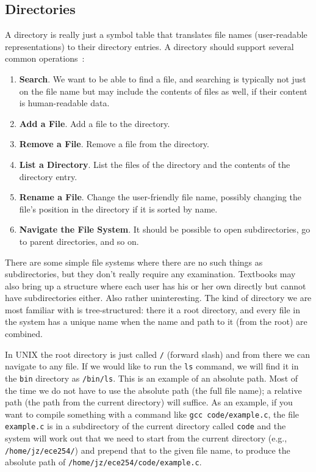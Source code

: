 \subsection*{Directories}

A directory is really just a symbol table that translates file names (user-readable representations) to their directory entries. A directory should support several common operations~\cite{osc}:

\begin{enumerate}
	\item \textbf{Search}. We want to be able to find a file, and searching is typically not just on the file name but may include the contents of files as well, if their content is human-readable data.
	\item \textbf{Add a File}. Add a file to the directory.
	\item \textbf{Remove a File}. Remove a file from the directory.
	\item \textbf{List a Directory}. List the files of the directory and the contents of the directory entry.
	\item \textbf{Rename a File}. Change the user-friendly file name, possibly changing the file's position in the directory if it is sorted by name.
	\item \textbf{Navigate the File System}. It should be possible to open subdirectories, go to parent directories, and so on.
\end{enumerate}

There are some simple file systems where there are no such things as subdirectories, but they don't really require any examination. Textbooks may also bring up a structure where each user has his or her own directly but cannot have subdirectories either. Also rather uninteresting. The kind of directory we are most familiar with is tree-structured: there it a root directory, and every file in the system has a unique name when the name and path to it (from the root) are combined.

In UNIX the root directory is just called \texttt{/} (forward slash) and from there we can navigate to any file. If we would like to run the \texttt{ls} command, we will find it in the \texttt{bin} directory as \texttt{/bin/ls}. This is an example of an absolute path. Most of the time we do not have to use the absolute path (the full file name); a relative path (the path from the current directory) will suffice. As an example, if you want to compile something with a command like \texttt{gcc code/example.c}, the file \texttt{example.c} is in a subdirectory of the current directory called \texttt{code} and the system will work out that we need to start from the current directory (e.g., \texttt{/home/jz/ece254/}) and prepend that to the given file name, to produce the absolute path of \texttt{/home/jz/ece254/code/example.c}.

